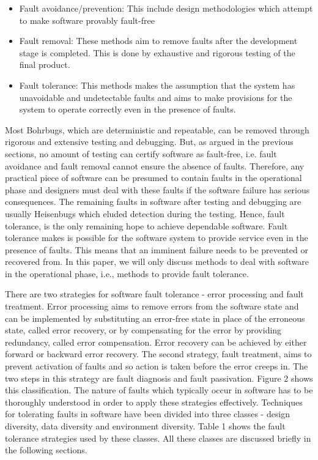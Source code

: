 \documentclass[oneside, a4paper, 11pt]{memoir}
\begin{document}
\begin{itemize}
\item Fault avoidance/prevention: This include design methodologies which attempt to make software provably fault-free
\item Fault removal: These methods aim to remove faults after the development stage is completed. This is done by exhaustive and rigorous testing of the final product.
\item Fault tolerance: This methods makes the assumption that the system has unavoidable and undetectable faults and aims to make provisions for the system to operate correctly even in the presence of faults.
\end{itemize}

Most Bohrbugs, which are deterministic and repeatable, can be removed through rigorous and extensive testing and debugging. But, as argued in the previous sections, no amount of testing can certify software as fault-free, i.e. fault avoidance and fault removal cannot ensure the absence of faults. Therefore, any practical piece of software can be presumed to contain faults in the operational phase and designers must deal with these faults if the software failure has serious consequences. The remaining faults in software after testing and debugging are usually Heisenbugs which eluded detection during the testing. Hence, fault tolerance, is the only remaining hope to achieve dependable software. Fault tolerance makes is possible for the software system to provide service even in the presence of faults. This means that an imminent failure needs to be prevented or recovered from. In this paper, we will only discuss methods to deal with software in the operational phase, i.e., methods to provide fault tolerance.

There are two strategies for software fault tolerance - error processing and fault treatment. Error processing aims to remove errors from the software state and can be implemented by substituting an error-free state in place of the erroneous state, called error recovery, or by compensating for the error by providing redundancy, called error compensation. Error recovery can be achieved by either forward or backward error recovery. The second strategy, fault treatment, aims to prevent activation of faults and so action is taken before the error creeps in. The two steps in this strategy are fault diagnosis and fault passivation. Figure 2 shows this classification. The nature of faults which typically occur in software has to be thoroughly understood in order to apply these strategies effectively. Techniques for tolerating faults in software have been divided into three classes - design diversity, data diversity and environment diversity. Table 1 shows the fault tolerance strategies used by these classes. All these classes are discussed briefly in the following sections.
\end{document}

